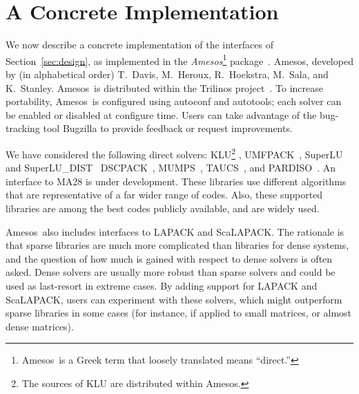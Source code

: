 \documentclass[acmtocl]{acmtrans2m}
\newcommand{\amesos}{{\sc Amesos}}
\begin{document}
\section{A Concrete Implementation}
\label{sec:concrete}

We now describe a concrete implementation of the interfaces of
Section~\ref{sec:design}, as implemented in
the {\sl \amesos}\footnote{
\amesos\ is a Greek term that loosely translated means ``direct.''} package~\cite{Amesos-Reference-Guide}.
\amesos,
developed by (in alphabetical order) T.~Davis, M.~Heroux, R.~Hoekstra, 
M.~Sala, and K.~Stanley. \amesos\ is distributed within the
Trilinos project~\cite{heroux05trilinos}.
To increase portability, \amesos\ is configured using autoconf and autotools;
each solver can be enabled or disabled at configure time. Users can take
advantage of the bug-tracking tool Bugzilla to provide feedback or request
improvements.

We have considered the following direct solvers:
  KLU\footnote{The sources of KLU are
  distributed within \amesos.} \cite{davis05klu}, 
  UMFPACK~\cite{umfpack-home-page}, SuperLU and
  SuperLU\_DIST~\cite{superlu-manual}
  DSCPACK~\cite{dscpack-manual}, 
  MUMPS~\cite{mumps-manual}, 
  TAUCS~\cite{irony04parallel,rotkin04design,rozin04locality}, 
  and PARDISO~\cite{oskl:04-etna,sg:04-fgcs}. An interface to MA28 is
  under development.
These libraries use different algorithms that are
representative of a far wider range of codes. Also, these supported libraries are
among the best codes publicly available, and are widely used.  

\amesos\ also includes interfaces to LAPACK and ScaLAPACK. The rationale is
that
sparse libraries are much more complicated than libraries for dense systems,
  and the question of how much is gained with respect to dense solvers 
  is often asked. Dense
  solvers are usually more robust than sparse solvers and could be used as
  last-resort in extreme cases.  By adding support for LAPACK and ScaLAPACK, 
  users can experiment with these
  solvers, which might outperform  sparse libraries in some cases 
  (for instance, if applied to small matrices, or almost dense matrices). 
\end{document}
